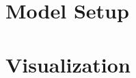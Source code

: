 \documentclass[a4paper,11pt]{article}
\begin{document}
\section{Model Setup}
\label{sec:modelsetup}

\section{Visualization}



\end{document}

